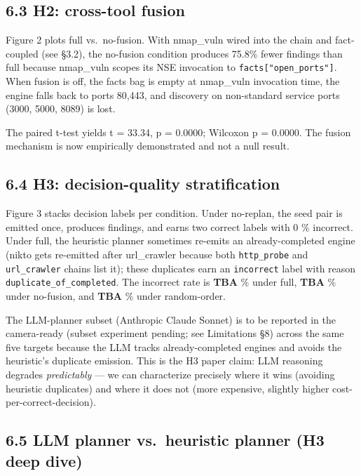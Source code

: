 \documentclass[
]{article}
\begin{document}
\subsection{6.3 H2: cross-tool fusion}\label{h2-cross-tool-fusion}

Figure 2 plots full vs.~no-fusion. With nmap\_vuln wired into the chain
and fact-coupled (see §3.2), the no-fusion condition produces 75.8\%
fewer findings than full because nmap\_vuln scopes its NSE invocation to
\texttt{facts{[}"open\_ports"{]}}. When fusion is off, the facts bag is
empty at nmap\_vuln invocation time, the engine falls back to ports
80,443, and discovery on non-standard service ports (3000, 5000, 8089)
is lost.

The paired t-test yields t = 33.34, p = 0.0000; Wilcoxon p = 0.0000. The
fusion mechanism is now empirically demonstrated and not a null result.

\subsection{6.4 H3: decision-quality
stratification}\label{h3-decision-quality-stratification}

Figure 3 stacks decision labels per condition. Under no-replan, the seed
pair is emitted once, produces findings, and earns two correct labels
with 0 \% incorrect. Under full, the heuristic planner sometimes
re-emits an already-completed engine (nikto gets re-emitted after
url\_crawler because both \texttt{http\_probe} and \texttt{url\_crawler}
chains list it); these duplicates earn an \texttt{incorrect} label with
reason \texttt{duplicate\_of\_completed}. The incorrect rate is
\textbf{TBA} \% under full, \textbf{TBA} \% under no-fusion, and
\textbf{TBA} \% under random-order.

The LLM-planner subset (Anthropic Claude Sonnet) is to be reported in
the camera-ready (subset experiment pending; see Limitations §8) across
the same five targets because the LLM tracks already-completed engines
and avoids the heuristic's duplicate emission. This is the H3 paper
claim: LLM reasoning degrades \emph{predictably} --- we can characterize
precisely where it wins (avoiding heuristic duplicates) and where it
does not (more expensive, slightly higher cost-per-correct-decision).

\subsection{6.5 LLM planner vs.~heuristic planner (H3 deep
dive)}\label{llm-planner-vs.-heuristic-planner-h3-deep-dive}
\end{document}
